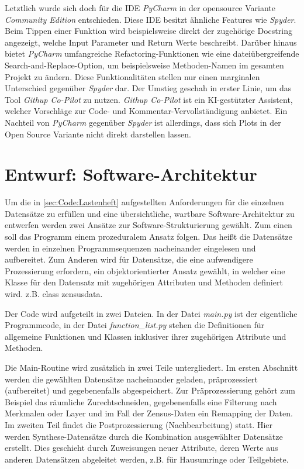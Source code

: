 		Letztlich wurde sich doch für die IDE \textit{PyCharm} in der opensource Variante \textit{Community Edition} entschieden. Diese IDE besitzt ähnliche Features wie \textit{Spyder}. Beim Tippen einer Funktion wird beispielsweise direkt der zugehörige Docstring angezeigt, welche Input Parameter und Return Werte beschreibt. Darüber hinaus bietet \textit{PyCharm} umfangreiche Refactoring-Funktionen wie eine dateiübergreifende Search-and-Replace-Option, um beispielsweise Methoden-Namen im gesamten Projekt zu ändern. Diese Funktionalitäten stellen nur einen marginalen Unterschied gegenüber \textit{Spyder} dar. Der Umstieg geschah in erster Linie, um das Tool \textit{Githup Co-Pilot} zu nutzen. \textit{Githup Co-Pilot} ist ein KI-gestützter Assistent, welcher Vorschläge zur Code- und Kommentar-Vervollständigung anbietet. Ein Nachteil von \textit{PyCharm} gegenüber \textit{Spyder} ist allerdings, dass sich Plots in der Open Source Variante nicht direkt darstellen lassen.
		
		
	\section{Entwurf: Software-Architektur}
	\label{sec:Code:Entwurf_Softwarearchitektur}
		Um die in \autoref{sec:Code:Lastenheft} aufgestellten Anforderungen für die einzelnen Datensätze zu erfüllen und eine übersichtliche, wartbare Software-Architektur zu entwerfen werden zwei Ansätze zur Software-Strukturierung gewählt. Zum einen soll das Programm einem prozeduralem Ansatz folgen. Das heißt die Datensätze werden in einzelnen Programmsequenzen nacheinander eingelesen und aufbereitet. Zum Anderen wird für Datensätze, die eine aufwendigere Prozessierung erfordern, ein objektorientierter Ansatz gewählt, in welcher eine Klasse für den Datensatz mit zugehörigen Attributen und Methoden definiert wird. z.B. class zensusdata. 
		
		Der Code wird aufgeteilt in zwei Dateien. In der Datei \textit{main.py} ist der eigentliche Programmcode, in der Datei \textit{function\_list.py} stehen die Definitionen für allgemeine Funktionen und Klassen inklusiver ihrer zugehörigen Attribute und Methoden. 
		
		Die Main-Routine wird zusätzlich in zwei Teile untergliedert. Im ersten Abschnitt werden die gewählten Datensätze nacheinander geladen, präprozessiert (aufbereitet) und gegebenenfalls abgespeichert. Zur Präprozessierung gehört zum Beispiel das räumliche Zurechtschneiden, gegebenenfalls eine Filterung nach Merkmalen oder Layer und im Fall der Zensus-Daten ein Remapping der Daten. Im zweiten Teil findet die Postprozessierung (Nachbearbeitung) statt. Hier werden Synthese-Datensätze durch die Kombination ausgewählter Datensätze erstellt. Dies geschieht durch Zuweisungen neuer Attribute, deren Werte aus anderen Datensätzen abgeleitet werden, z.B. für Hausumringe oder Teilgebiete.
		

